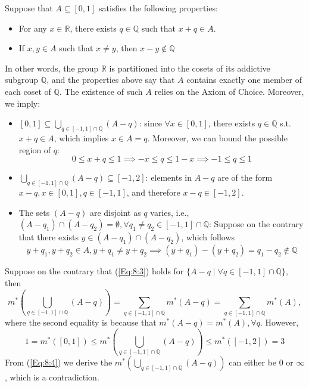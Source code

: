 \begin{example}\label{exp:8:2}
Suppose that $A\subseteq[0,1]$ satisfies the following properties:
\begin{itemize}
\item
For any $x\in\mathbb{R}$,
there exists $q\in\mathbb{Q}$ such that
$x+q\in A$.
\item
If $x,y\in A$ such that $x\ne y$, then $x-y\notin\mathbb{Q}$
\end{itemize}
In other words, 
the group $\mathbb{R}$ is partitioned into the cosets of its addictive subgroup $\mathbb{Q}$, and the properties above say that $A$ contains exactly one member of each coset of $\mathbb{Q}$.
The existence of such $A$ relies on the Axiom of Choice.
Moreover, we imply:
\begin{itemize}
\item
$[0,1]\subseteq\bigcup_{q\in[-1,1]\cap\mathbb{Q}}(A-q)$:
since $\forall x\in[0,1]$, there exists $q\in\mathbb{Q}$ s.t. $x+q\in A$, which implies $x\in A=q$.
Moreover, we can bound the possible region of $q$:
\[
0\le x+q\le 1\implies -x\le q\le 1-x\implies -1\le q\le 1
\]
\item
$\bigcup_{q\in[-1,1]\cap\mathbb{Q}}(A-q)\subseteq[-1,2]$:
elements in $A-q$ are of the form $x-q, x\in[0,1],q\in[-1,1]$, and therefore $x-q\in[-1,2]$.
\item
The sets $(A-q)$ are disjoint as $q$ varies, i.e., $(A-q_1)\cap(A-q_2)=\emptyset,\forall q_1\ne q_2\in[-1,1]\cap\mathbb{Q}$:
Suppose on the contrary that there exists $y\in (A-q_1)\cap(A-q_2)$, which follows
\[
y+q_1,y+q_2\in A,
y+q_1\ne y+q_2\implies
(y+q_1)-(y+q_2)=q_1-q_2\notin\mathbb{Q}
\]
\end{itemize}
Suppose on the contrary that (\ref{Eq:8:3}) holds for $\{A-q\mid\forall q\in[-1,1]\cap\mathbb{Q}\}$, then
\begin{equation}\label{Eq:8:4}
m^*\left(\bigcup_{q\in[-1,1]\cap\mathbb{Q}}(A-q)\right)=\sum_{q\in[-1,1]\cap\mathbb{Q}}m^*(A-q)=\sum_{q\in[-1,1]\cap\mathbb{Q}}m^*(A),
\end{equation}
where the second equality is because that $m^*(A-q)=m^*(A),\forall q$.
However,
\begin{equation}\label{Eq:8:5}
1=m^*([0,1])\le m^*\left(\bigcup_{q\in[-1,1]\cap\mathbb{Q}}(A-q)\right)\le m^*([-1,2])=3
\end{equation}
From (\ref{Eq:8:4}) we derive the $m^*\left(\bigcup_{q\in[-1,1]\cap\mathbb{Q}}(A-q)\right)$ can either be $0$ or $\infty$, which is a contradiction.
\end{example}
